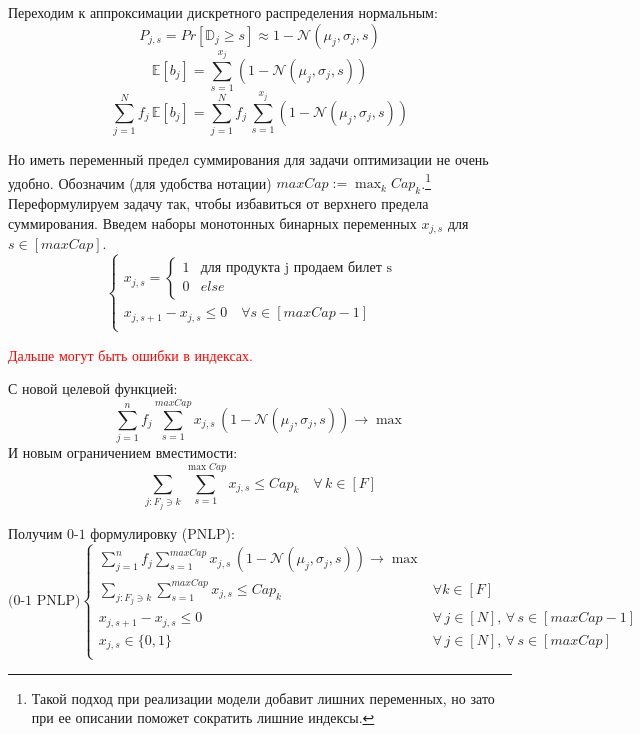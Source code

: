 \documentclass[reqno]{article}
\theoremstyle{definition}
\theoremstyle{definition}
\theoremstyle{definition}
\theoremstyle{definition}
\theoremstyle{definition}
\theoremstyle{definition}
\theoremstyle{definition}
\theoremstyle{definition}
\theoremstyle{definition}
\begin{document}
		Переходим к аппроксимации дискретного распределения нормальным:
		$$P_{j,s} = Pr[\mathds{D}_j \geq s] \approx 1 - \mathcal{N}(\mu_j, \sigma_j, s)$$
		$$\mathds{E}[b_j] = \sum\limits_{s = 1}^{x_j} (1 - \mathcal{N}(\mu_j, \sigma_j, s))$$
		$$\sum\limits^N_{j = 1} f_j\,\mathds{E}[b_j] = \sum\limits^N_{j = 1} f_j\,\sum\limits_{s = 1}^{x_j} (1 - \mathcal{N}(\mu_j, \sigma_j, s))$$
		
		Но иметь переменный предел суммирования для задачи оптимизации не очень удобно. Обозначим (для удобства нотации) $maxCap := \max_k Cap_k$.\footnote{Такой подход при реализации модели добавит лишних переменных, но зато при ее описании поможет сократить лишние индексы.} Переформулируем задачу так, чтобы избавиться от верхнего предела суммирования. Введем наборы монотонных бинарных переменных $x_{j,s}$ для $s \in [maxCap]$.
		$$
		\begin{cases}
			x_{j,s} =
		\begin{cases}
			1 & \text{для продукта j продаем билет s}\\
			0 & else\\
		\end{cases} & \\
		x_{j,s + 1} - x_{j, s} \leq 0\quad \forall s \in [maxCap - 1] & \\
		\end{cases}
		$$
		
		\textcolor{red}{Дальше могут быть ошибки в индексах.}
		
		С новой целевой функцией:
		$$\sum\limits^n_{j = 1} f_j \sum\limits^{maxCap}_{s = 1} x_{j, s}\,(1 - \mathcal{N}(\mu_j, \sigma_j, s)) \rightarrow \max$$
		И новым ограничением вместимости:
		$$\sum\limits_{j : F_j \ni k} \sum\limits^{\max Cap}_{s = 1} x_{j, s} \leq Cap_k \quad \forall\, k \in [F]$$
		
		Получим $0$-$1$ формулировку (PNLP):
		$$
		\text{(0-1 PNLP)}
		\begin{cases}
			\sum\limits^n_{j = 1} f_j \sum\limits^{maxCap}_{s = 1} x_{j, s}\,(1 - \mathcal{N}(\mu_j, \sigma_j, s)) \rightarrow \max & \\
			\sum\limits_{j : F_j \ni k} \sum\limits^{maxCap}_{s = 1} x_{j, s} \leq Cap_k & \forall k \in [F] \\
			x_{j,s + 1} - x_{j, s} \leq 0 \quad & \forall\, j \in [N],\, \forall\, s \in [maxCap - 1] \\
			x_{j, s} \in \{0, 1\} &  \forall\, j \in [N],\, \forall\, s \in [maxCap] \\
		\end{cases}
		$$
		
\end{document}
